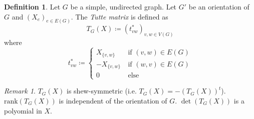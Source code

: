 \documentclass[11pt, a4paper]{article}
\theoremstyle{remark}
\newtheorem{remark}[theorem]{Remark}
\theoremstyle{definition}
\newtheorem{definition}[theorem]{Definition}
\begin{document}
\begin{definition}
	Let $G$ be a simple, undirected graph. Let $G'$ be an orientation
	of $G$ and $(X_e)_{e\in E(G)}$. The \emph{Tutte matrix} is defined as
	\[T_G(X)\coloneqq (t^*_{vw})_{v,w\in V(G)}\]
	where
	\[
		t^*_{vw}\coloneqq \begin{cases}
			X_{\{v,w\}} \quad & \text{if $(v,w)\in E(G)$} \\
			-X_{\{v,w\}}      & \text{if $(w,v)\in E(G)$} \\
			0                 & \text{else}
		\end{cases}
	\]
\end{definition}

\begin{remark}
	$T_G(X)$ is shew-symmetric (i.e. $T_G(X)=-(T_G(X))^t$).
	$\mathrm{rank}(T_G(X))$ is independent of the orientation of $G$.
	$\det(T_G(X))$ is a polyomial in $X$.
\end{remark}
\end{document}
